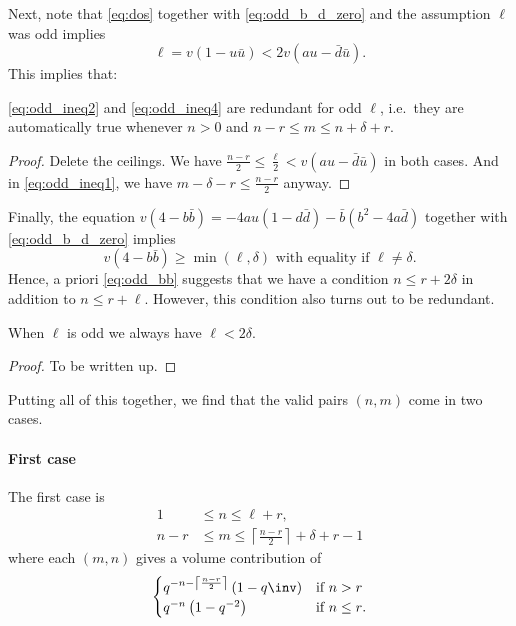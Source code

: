 Next, note that \eqref{eq:dos} together with \eqref{eq:odd_b_d_zero}
and the assumption $\ell$ was odd implies
\begin{equation}
  \ell = v(1-u \bar u) < 2v(au - \bar d \bar u).
  \label{eq:odd_center_distance}
\end{equation}
This implies that:
\begin{fact}
  \eqref{eq:odd_ineq2} and \eqref{eq:odd_ineq4} are redundant for odd $\ell$,
  i.e.\ they are automatically true whenever $n > 0$ and $n-r \le m \le n+\delta+r$.
\end{fact}
\begin{proof}
  Delete the ceilings.
  We have $\frac{n-r}{2} \le \frac{\ell}{2} < v(au - \bar d \bar u)$ in both cases.
  And in \eqref{eq:odd_ineq1}, we have $m-\delta-r \le \frac{n-r}{2}$ anyway.
\end{proof}

Finally, the equation $v(4-b \bar b) = -4au(1-d\bar d) - \bar b(b^2-4a\bar d)$
together with \eqref{eq:odd_b_d_zero} implies
\begin{equation}
  v(4-b\bar b) \ge \min(\ell,\delta) \text{ with equality if } \ell \neq \delta.
  \label{eq:odd_bb}
\end{equation}
Hence, a priori \eqref{eq:odd_bb} suggests that we have a condition
$n \le r + 2 \delta$ in addition to $n \le r + \ell$.
However, this condition also turns out to be redundant.
\begin{lemma}
  When $\ell$ is odd we always have $\ell < 2 \delta$.
  \label{lem:wtfell}
\end{lemma}
\begin{proof}
  To be written up.
\end{proof}

Putting all of this together,
we find that the valid pairs $(n,m)$ come in two cases.

\paragraph{First case}
The first case is
\begin{equation}
  \begin{aligned}
    1 &\leq n \leq \ell + r, \\
    n-r &\leq m \leq \left\lceil \frac{n-r}{2} \right\rceil+\delta+r - 1
  \end{aligned}
  \label{eq:odd_range1}
\end{equation}
where each $(m,n)$ gives a volume contribution of
\[
  \begin{cases}
    q^{-n - \left\lceil \frac{n-r}{2} \right\rceil} \left( 1 - q\inv \right)
      & \text{if $n > r$} \\
    q^{-n} \left( 1 - q^{-2} \right)
      & \text{if $n \leq r$}.
  \end{cases}
\]

